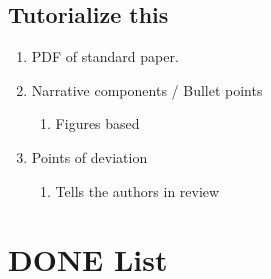 \documentclass[12pt]{article}
\begin{document}
\subsection{Tutorialize this}

\begin{enumerate}
\item PDF of standard paper.
\item Narrative components / Bullet points
  \begin{enumerate}
  \item Figures based
  \end{enumerate}
\item Points of deviation
  \begin{enumerate}
  \item Tells the authors in review
  \end{enumerate}
\end{enumerate}


\section{DONE List}




\end{document}
